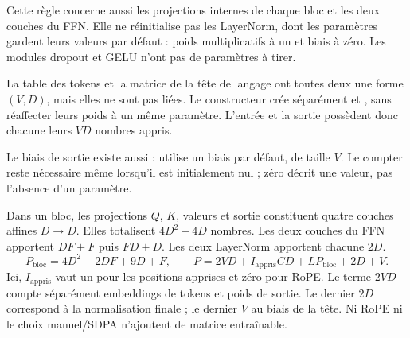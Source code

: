 Cette règle concerne aussi les projections internes de chaque bloc et les deux couches du FFN. Elle ne réinitialise pas les LayerNorm, dont les paramètres gardent leurs valeurs par défaut : poids multiplicatifs à un et biais à zéro. Les modules dropout et GELU n'ont pas de paramètres à tirer.

La table des tokens et la matrice de la tête de langage ont toutes deux une forme $(V,D)$, mais elles ne sont pas liées. Le constructeur crée séparément  et , sans réaffecter leurs poids à un même paramètre. L'entrée et la sortie possèdent donc chacune leurs $VD$ nombres appris.

Le biais de sortie existe aussi :  utilise un biais par défaut, de taille $V$. Le compter reste nécessaire même lorsqu'il est initialement nul ; zéro décrit une valeur, pas l'absence d'un paramètre.






Dans un bloc, les projections $Q$, $K$, valeurs et sortie constituent quatre couches affines $D\to D$. Elles totalisent $4D^2+4D$ nombres. Les deux couches du FFN apportent $DF+F$ puis $FD+D$. Les deux LayerNorm apportent chacune $2D$.
\[
 P_{\mathrm{bloc}}=4D^2+2DF+9D+F,\qquad
 P=2VD+I_{\mathrm{appris}}CD+L P_{\mathrm{bloc}}+2D+V.
\]
Ici, $I_{\mathrm{appris}}$ vaut un pour les positions apprises et zéro pour RoPE. Le terme $2VD$ compte séparément embeddings de tokens et poids de sortie. Le dernier $2D$ correspond à la normalisation finale ; le dernier $V$ au biais de la tête. Ni RoPE ni le choix manuel/SDPA n'ajoutent de matrice entraînable.

